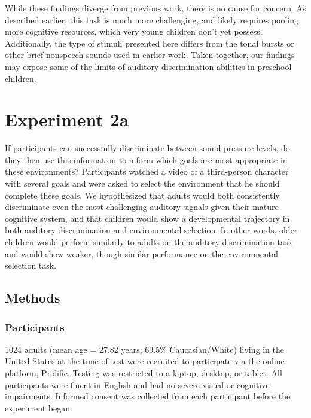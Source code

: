 \documentclass[10pt, letterpaper]{article}
\begin{document}
While these findings diverge from previous work, there is no cause for
concern. As described earlier, this task is much more challenging, and
likely requires pooling more cognitive resources, which very young
children don't yet possess. Additionally, the type of stimuli presented
here differs from the tonal bursts or other brief nonspeech sounds used
in earlier work. Taken together, our findings may expose some of the
limits of auditory discrimination abilities in preschool children.

\hypertarget{experiment-2a}{%
\section{Experiment 2a}\label{experiment-2a}}

If participants can successfully discriminate between sound pressure
levels, do they then use this information to inform which goals are most
appropriate in these environments? Participants watched a video of a
third-person character with several goals and were asked to select the
environment that he should complete these goals. We hypothesized that
adults would both consistently discriminate even the most challenging
auditory signals given their mature cognitive system, and that children
would show a developmental trajectory in both auditory discrimination
and environmental selection. In other words, older children would
perform similarly to adults on the auditory discrimination task and
would show weaker, though similar performance on the environmental
selection task.

\hypertarget{methods-2}{%
\subsection{Methods}\label{methods-2}}

\hypertarget{participants-2}{%
\subsubsection{Participants}\label{participants-2}}

1024 adults (mean age = 27.82 years; 69.5\% Caucasian/White) living in
the United States at the time of test were recruited to participate via
the online platform, Prolific. Testing was restricted to a laptop,
desktop, or tablet. All participants were fluent in English and had no
severe visual or cognitive impairments. Informed consent was collected
from each participant before the experiment began.
\end{document}
